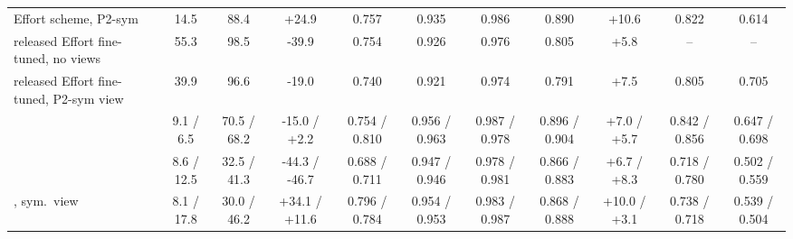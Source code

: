 \begin{tabular}{@{}l cc cc cc cc cc@{}}
Effort scheme, P2-sym & 14.5 & 88.4 & +24.9 & 0.757 & 0.935 & 0.986 & 0.890 & +10.6 & 0.822 & 0.614 \\
released Effort fine-tuned, no views & 55.3 & 98.5 & -39.9 & 0.754 & 0.926 & 0.976 & 0.805 & +5.8 & -- & -- \\
released Effort fine-tuned, P2-sym view & 39.9 & 96.6 & -19.0 & 0.740 & 0.921 & 0.974 & 0.791 & +7.5 & 0.805 & 0.705 \\
\oursB{} & 9.1 / 6.5 & 70.5 / 68.2 & -15.0 / +2.2 & 0.754 / 0.810 & 0.956 / 0.963 & 0.987 / 0.978 & 0.896 / 0.904 & +7.0 / +5.7 & 0.842 / 0.856 & 0.647 / 0.698 \\
\oursF{} & 8.6 / 12.5 & 32.5 / 41.3 & -44.3 / -46.7 & 0.688 / 0.711 & 0.947 / 0.946 & 0.978 / 0.981 & 0.866 / 0.883 & +6.7 / +8.3 & 0.718 / 0.780 & 0.502 / 0.559 \\
\oursF{}, sym.\ view & 8.1 / 17.8 & 30.0 / 46.2 & +34.1 / +11.6 & 0.796 / 0.784 & 0.954 / 0.953 & 0.983 / 0.987 & 0.868 / 0.888 & +10.0 / +3.1 & 0.738 / 0.718 & 0.539 / 0.504 \\
\bottomrule
\end{tabular}
